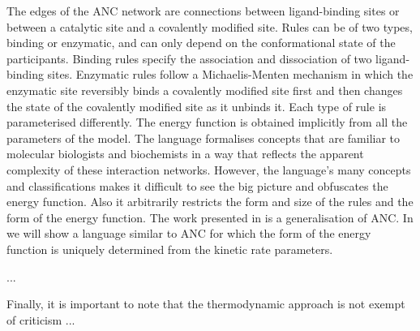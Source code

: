 The edges of the ANC network are connections between ligand-binding sites
or between a catalytic site and a covalently modified site.
Rules can be of two types, binding or enzymatic,
and can only depend on the conformational state of the participants.
Binding rules specify the association and dissociation of
two ligand-binding sites.
Enzymatic rules follow a Michaelis-Menten mechanism in which
the enzymatic site reversibly binds a covalently modified site first
and then changes the state of the covalently modified site
as it unbinds it.
Each type of rule is parameterised differently.
The energy function is obtained implicitly
from all the parameters of the model.
The language formalises concepts that are familiar to
molecular biologists and biochemists
in a way that reflects the apparent complexity
of these interaction networks.
However, the language's many concepts and classifications
makes it difficult to see the big picture %
and obfuscates the energy function. %
Also it arbitrarily restricts the form and size of the rules
and the form of the energy function.
The work presented in  is a generalisation of ANC.
In  we will show a language similar to ANC
for which the form of the energy function is uniquely determined
from the kinetic rate parameters.

...







Finally, it is important to note that the thermodynamic approach
is not exempt of criticism ... %


